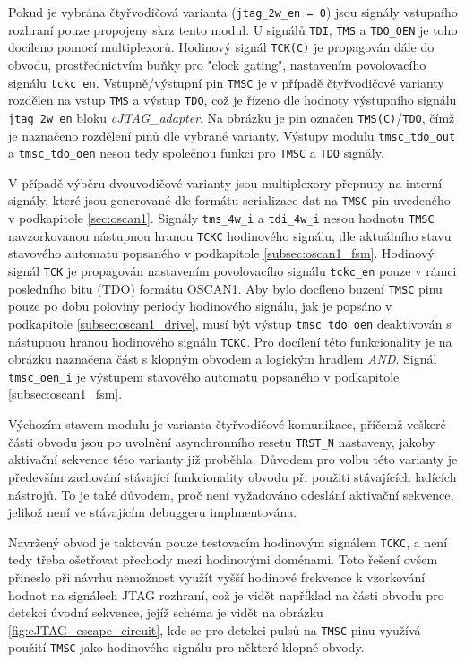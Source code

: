 Pokud je vybrána čtyřvodičová varianta (\texttt{jtag\_2w\_en = 0}) jsou signály vstupního rozhraní pouze propojeny skrz tento modul. U signálů \texttt{\acs{TDI}}, \texttt{\acs{TMS}} a \texttt{TDO\_OEN} je toho docíleno pomocí multiplexorů. Hodinový signál \texttt{TCK(C)} je propagován dále do obvodu, prostřednictvím buňky pro "clock gating", nastavením povolovacího signálu \texttt{tckc\_en}. Vstupně/výstupní pin \texttt{\acs{TMSC}} je v případě čtyřvodičové varianty rozdělen na vstup \texttt{\acs{TMS}} a výstup \texttt{\acs{TDO}}, což je řízeno dle hodnoty výstupního signálu \texttt{jtag\_2w\_en} bloku \textit{cJTAG\_adapter}. Na obrázku je pin označen \texttt{TMS(C)}/\texttt{TDO}, čímž je naznačeno rozdělení pinů dle vybrané varianty. Výstupy modulu \texttt{tmsc\_tdo\_out} a \texttt{tmsc\_tdo\_oen} nesou tedy společnou funkci pro \texttt{\acs{TMSC}} a \texttt{\acs{TDO}} signály.

V případě výběru dvouvodičové varianty jsou multiplexory přepnuty na interní signály, které jsou generované dle formátu serializace dat na \texttt{\acs{TMSC}} pin uvedeného v podkapitole \ref{sec:oscan1}. Signály \texttt{tms\_4w\_i} a \texttt{tdi\_4w\_i} nesou hodnotu \texttt{\acs{TMSC}} navzorkovanou nástupnou hranou \texttt{\acs{TCKC}} hodinového signálu, dle aktuálního stavu stavového automatu popsaného v podkapitole \ref{subsec:oscan1_fsm}. Hodinový signál \texttt{\acs{TCK}} je propagován nastavením povolovacího signálu \texttt{tckc\_en} pouze v rámci posledního bitu (TDO) formátu OSCAN1. Aby bylo docíleno buzení \texttt{\acs{TMSC}} pinu pouze po dobu poloviny periody hodinového signálu, jak je popsáno v podkapitole \ref{subsec:oscan1_drive}, musí být výstup \texttt{tmsc\_tdo\_oen} deaktivován s nástupnou hranou hodinového signálu \texttt{\acs{TCKC}}. Pro docílení této funkcionality je na obrázku naznačena část s klopným obvodem a logickým hradlem \textit{AND}. Signál \texttt{tmsc\_oen\_i} je výstupem stavového automatu popsaného v podkapitole \ref{subsec:oscan1_fsm}.

Výchozím stavem modulu je varianta čtyřvodičové komunikace, přičemž veškeré části obvodu jsou po uvolnění asynchronního resetu \texttt{TRST\_N} nastaveny, jakoby aktivační sekvence této varianty již proběhla. Důvodem pro volbu této varianty je především zachování stávající funkcionality obvodu při použití stávajících ladících nástrojů. To je také důvodem, proč není vyžadováno odeslání aktivační sekvence, jelikož není ve stávajícím debuggeru implmentována.

Navržený obvod je taktován pouze testovacím hodinovým signálem \texttt{\acs{TCKC}}, a není tedy třeba ošetřovat přechody mezi hodinovými doménami. Toto řešení ovšem přineslo při návrhu nemožnost využít vyšší hodinové frekvence k vzorkování hodnot na signálech \acs{JTAG} rozhraní, což je vidět například na části obvodu pro detekci úvodní sekvence, jejíž schéma je vidět na obrázku \ref{fig:cJTAG_escape_circuit}, kde se pro detekci pulsů na \texttt{\acs{TMSC}} pinu využívá použití \texttt{\acs{TMSC}} jako hodinového signálu pro některé klopné obvody.

